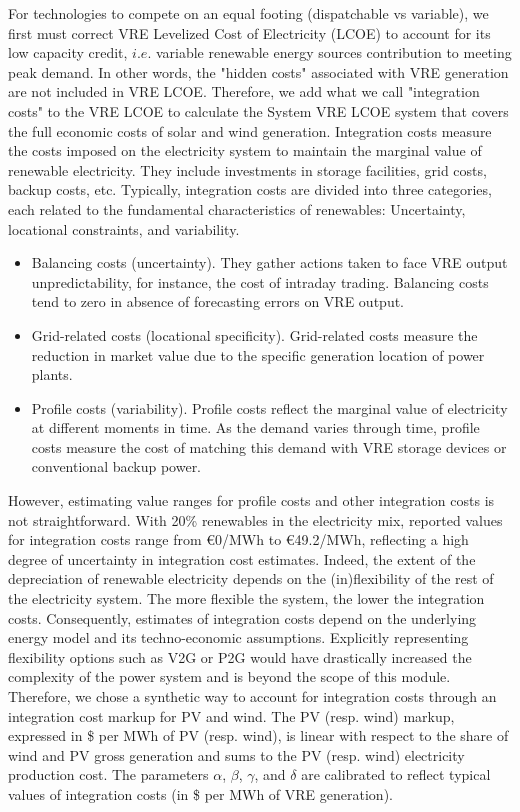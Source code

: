 { For technologies to compete on an equal footing (dispatchable vs variable), we first must correct VRE Levelized Cost of Electricity (LCOE) to account for its low capacity credit, $i.e.$ variable renewable energy sources contribution to meeting peak demand. In other words, the "hidden costs" associated with VRE generation are not included in VRE LCOE. Therefore, we add what we call "integration costs" to the VRE LCOE to calculate the System VRE LCOE system that covers the full economic costs of solar and wind generation. Integration costs measure the costs imposed on the electricity system to maintain the marginal value of renewable electricity. They include investments in storage facilities, grid costs, backup costs, etc. Typically, integration costs are divided into three categories, each related to the fundamental characteristics of renewables: Uncertainty, locational constraints, and variability.
\begin{itemize}
    \item Balancing costs (uncertainty). They gather actions taken to face VRE output unpredictability, for instance, the cost of intraday trading. Balancing costs tend to zero in absence of forecasting errors on VRE output.
    \item Grid-related costs (locational specificity). Grid-related costs measure the reduction in market value due to the specific generation location of power plants. 
    \item Profile costs (variability). Profile costs reflect the marginal value of electricity at different moments in time. As the demand varies through time, profile costs measure the cost of matching this demand with VRE storage devices or conventional backup power.
\end{itemize}

However, estimating value ranges for profile costs and other integration costs is not straightforward. With 20\% renewables in the electricity mix, reported values for integration costs range from €0/MWh to €49.2/MWh, \cite{Heptonstall2021} reflecting a high degree of uncertainty in integration cost estimates. Indeed, the extent of the depreciation of renewable electricity depends on the (in)flexibility of the rest of the electricity system. The more flexible the system, the lower the integration costs. Consequently, estimates of integration costs depend on the underlying energy model and its techno-economic assumptions. Explicitly representing flexibility options such as V2G or P2G would have drastically increased the complexity of the power system and is beyond the scope of this module. Therefore, we chose a synthetic way to account for integration costs through an integration cost markup for PV and wind. The PV (resp. wind) markup, expressed in \$ per MWh of PV (resp. wind), is linear with respect to the share of wind and PV gross generation and sums to the PV (resp. wind) electricity production cost. The parameters $\alpha$, $\beta$, $\gamma$, and $\delta$ are calibrated to reflect typical values of integration costs (in \$ per MWh of VRE generation).

}

